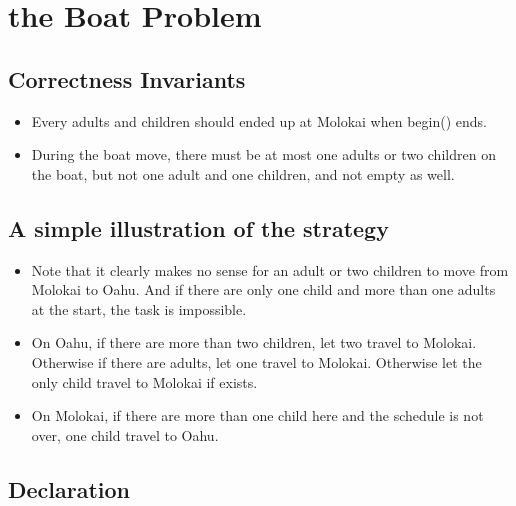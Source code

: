 \documentclass{article}
\begin{document}
	\section{the Boat Problem}
	
	\subsection{Correctness Invariants}
	
	\begin{itemize}
		\item Every adults and children should ended up at Molokai when begin() ends.
		
		\item During the boat move, there must be at most one adults or two children on the boat, but not one adult and one children, and not empty as well. 
	\end{itemize}
	
	\subsection{A simple illustration of the strategy}
	
	\begin{itemize}
		\item Note that it clearly makes no sense for an adult or two children to move from Molokai to Oahu. And if there are only one child and more than one adults at the start, the task is impossible.
		
		\item On Oahu, if there are more than two children, let two travel to Molokai. Otherwise if there are adults, let one travel to Molokai. Otherwise let the only child travel to Molokai if exists.
		
		\item On Molokai, if there are more than one child here and the schedule is not over, one child travel to Oahu.
	\end{itemize}
	
	\subsection{Declaration}
	
\end{document}

